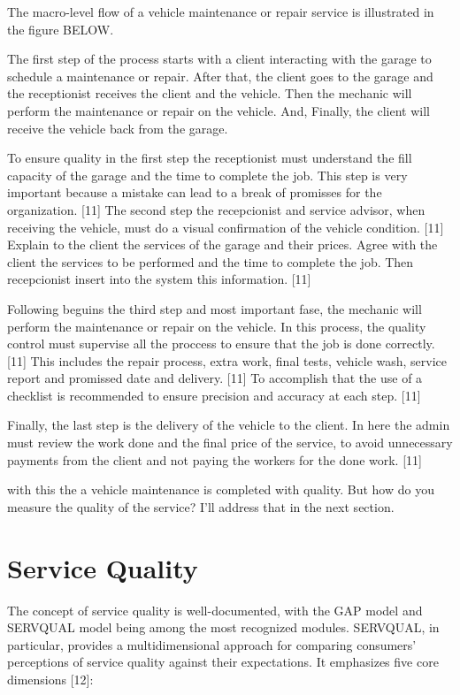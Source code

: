 The macro-level flow of a vehicle maintenance or repair service is illustrated in the figure BELOW. 

The first step of the process starts with a client interacting with the garage to schedule a maintenance or repair. 
After that, the client goes to the garage and the receptionist receives the client and the vehicle.
Then the mechanic will perform the maintenance or repair on the vehicle.
And, Finally, the client will receive the vehicle back from the garage.

To ensure quality in the first step the receptionist must understand the fill capacity of the garage and the time to complete the job. 
This step is very important because a mistake can lead to a break of promisses for the organization. [11]
The second step the recepcionist and service advisor, when receiving the vehicle, must do a visual confirmation of the vehicle condition. [11]
Explain to the client the services of the garage and their prices. Agree with the client the services to be performed and the time to complete the job. 
Then recepcionist insert into the system this information. [11]

Following beguins the third step and most important fase, the mechanic will perform the maintenance or repair on the vehicle. 
In this process, the quality control must supervise all the proccess to ensure that the job is done correctly. [11]
This includes the repair process, extra work, final tests, vehicle wash, service report and promissed date and delivery. [11]
To accomplish that the use of a checklist is recommended to ensure precision and accuracy at each step. [11]

Finally, the last step is the delivery of the vehicle to the client. 
In here  the admin must review the work done and the final price of the service, to avoid unnecessary payments from the client and not paying the workers for the done work. [11]

with this the a vehicle maintenance is completed with quality. 
But how do you measure the quality of the service?
I'll address that in the next section.

\section{Service Quality}
The concept of service quality is well-documented, with the GAP model and SERVQUAL model being among the most recognized modules. 
SERVQUAL, in particular, provides a multidimensional approach for comparing consumers’ perceptions of service quality against their expectations. 
It emphasizes five core dimensions [12]:

